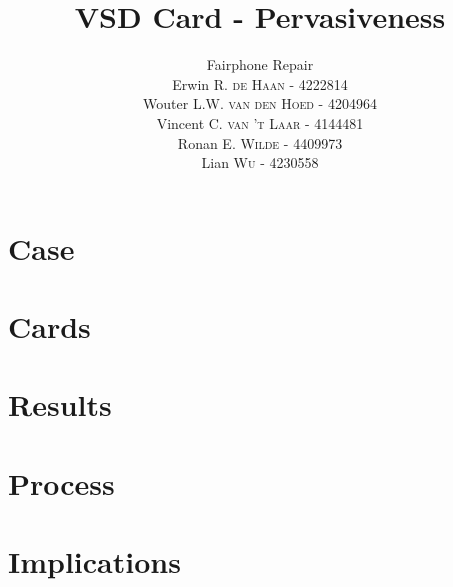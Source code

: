 \documentclass[final]{scrartcl} %
\title{VSD Card - Pervasiveness}
\author{Fairphone Repair \\
Erwin R. \textsc{de Haan} - 4222814\\
Wouter L.W. \textsc{van den Hoed} - 4204964 \\
Vincent C. \textsc{van 't Laar} - 4144481 \\
Ronan E. \textsc{Wilde} - 4409973 \\
Lian \textsc{Wu} - 4230558 \\}
\begin{document}
\maketitle
\section{Case}
\section{Cards}
\section{Results}
\section{Process}
\section{Implications}

\printbibliography
\end{document}
